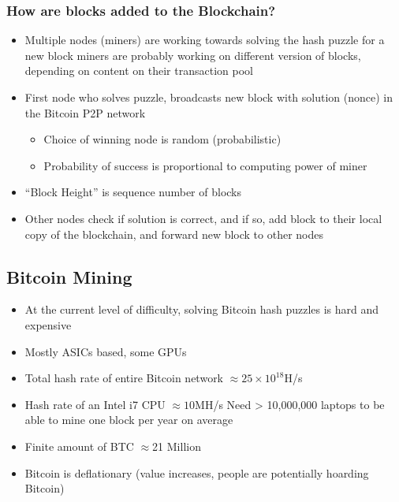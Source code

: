 \subsubsection{How are blocks added to the Blockchain?}
\begin{itemize}
	\item Multiple nodes (miners) are working towards solving the hash puzzle for a new block
	\subitem miners are probably working on different version of blocks, depending on content on their transaction pool
	\item First node who solves puzzle, broadcasts new block with solution (nonce) in the Bitcoin P2P network
	\begin{itemize}
		\item Choice of winning node is random (probabilistic)
		\item Probability of success is proportional to computing power of miner
	\end{itemize}
	\item ``Block Height'' is sequence number of blocks
	\item Other nodes check if solution is correct, and if so, add block to their local copy of the blockchain, and forward new block to other nodes
\end{itemize}

\subsection{Bitcoin Mining}
\begin{itemize}
	\item At the current level of difficulty, solving Bitcoin hash puzzles is hard and expensive
	\item Mostly ASICs based, some GPUs
	\item Total hash rate of entire Bitcoin network $\approx25\times10^{18}$H/s
	\item Hash rate of an Intel i7 CPU $\approx10$MH/s
	\subitem Need > 10,000,000 laptops to be able to mine one block per year on average
	\item Finite amount of BTC $\approx$21 Million
	\item Bitcoin is deflationary (value increases, people are potentially hoarding Bitcoin)
\end{itemize}
